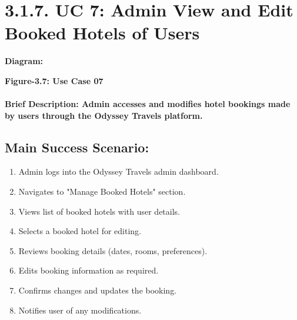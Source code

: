 \documentclass{scrreprt}
\begin{document}
\section*{\textbf{3.1.7. UC 7: Admin View and Edit Booked Hotels of Users}}
\textbf{Diagram:}
\newline
\newline

\begin{center}
    \parbox{0.8\textwidth}{ 
        \centering
    }
\end{center}
\begin{center}
    \parbox{0.8\textwidth}{ 
        \centering
        \textbf{Figure-3.7: Use Case 07}
    }
\end{center}

\paragraph {\textnormal{Brief Description: 
Admin accesses and modifies hotel bookings made by users through the Odyssey Travels platform.}}

\subsection*{\textbf{Main Success Scenario:}}

\begin{enumerate}
    \item Admin logs into the Odyssey Travels admin dashboard.
    \item Navigates to "Manage Booked Hotels" section.
    \item Views list of booked hotels with user details.
    \item Selects a booked hotel for editing.
    \item Reviews booking details (dates, rooms, preferences).
    \item Edits booking information as required.
    \item Confirms changes and updates the booking.
    \item Notifies user of any modifications.
\end{enumerate}
\end{document}
